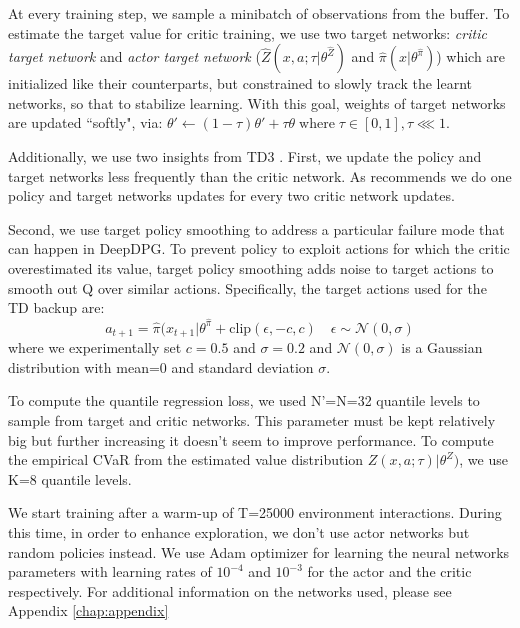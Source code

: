 At every training step, we sample a minibatch of observations from the buffer.
To estimate the target value for critic training, we use two target networks:  \textit{critic target network} and \textit{actor target network}
($\hat{Z}(x,a;\tau | \theta^{\hat{Z}})$ and  $\hat{\pi}(x | \theta^{\hat{\pi}})$) which are initialized
like their counterparts, but constrained to slowly track the learnt networks, so that to stabilize learning.
With this goal, weights of target networks are updated ``softly", via:
$\theta' \leftarrow (1-\tau)\theta' + \tau\theta \; \text{where} \; \tau \in [0,1], \tau \lll 1$.

Additionally, we use two insights from TD3 \citet{Fujimoto2018}.
First, we update the policy and target networks less frequently than the critic network. As 
\citet{Fujimoto2018} recommends we do one policy and target networks updates for every 
two critic network updates. 

Second, we use target policy smoothing to address a particular failure mode that can happen
in DeepDPG. To prevent policy to exploit 
actions for which the critic overestimated its value, target policy smoothing adds noise to target actions
to smooth out Q over similar actions. Specifically, the target actions used for the TD backup are:
\begin{equation}
    a_{t+1}=\hat{\pi}(x_{t+1} | \theta^{\hat{\pi}} + \text{clip}(\epsilon, -c, c) \quad \epsilon \sim \mathcal{N}(0,\sigma)
\end{equation}
where we experimentally set $c=0.5$ and $\sigma=0.2$ and $\mathcal{N}(0,\sigma)$ is a
Gaussian distribution with mean=0 and standard deviation $\sigma$.

To compute the quantile regression loss, we used N'=N=32 quantile levels to sample from
target and critic networks. This parameter must be kept relatively big but further increasing
it doesn't seem to improve performance.
To compute the empirical CVaR from the estimated value distribution 
$Z(x,a; \tau) | \theta^Z)$, we use K=8 quantile levels.


We start training after a warm-up of T=25000 environment interactions. During this time, in order
to enhance exploration, we don't use actor networks but random policies instead.
We use Adam optimizer for learning the neural networks parameters with learning rates of $10^{-4}$ and $10^{-3}$
for the actor and the critic respectively.
For additional information on the networks used, please see Appendix \ref{chap:appendix}





